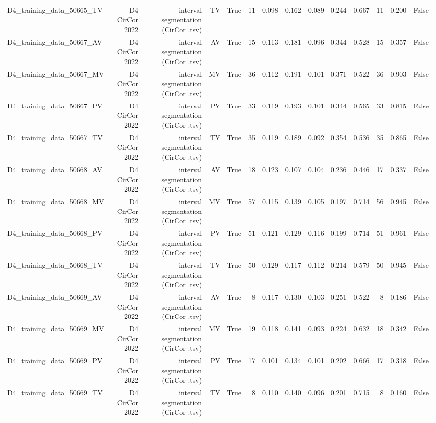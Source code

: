 \begin{table}[htbp]
\begin{tabular}{lrrrrrrrrrrrrr}
    D4\_training\_data\_50665\_TV & D4 CirCor 2022 & interval segmentation (CirCor .tsv) & TV & True & 11 & 0.098 & 0.162 & 0.089 & 0.244 & 0.667 & 11 & 0.200 & False \\
    D4\_training\_data\_50667\_AV & D4 CirCor 2022 & interval segmentation (CirCor .tsv) & AV & True & 15 & 0.113 & 0.181 & 0.096 & 0.344 & 0.528 & 15 & 0.357 & False \\
    D4\_training\_data\_50667\_MV & D4 CirCor 2022 & interval segmentation (CirCor .tsv) & MV & True & 36 & 0.112 & 0.191 & 0.101 & 0.371 & 0.522 & 36 & 0.903 & False \\
    D4\_training\_data\_50667\_PV & D4 CirCor 2022 & interval segmentation (CirCor .tsv) & PV & True & 33 & 0.119 & 0.193 & 0.101 & 0.344 & 0.565 & 33 & 0.815 & False \\
    D4\_training\_data\_50667\_TV & D4 CirCor 2022 & interval segmentation (CirCor .tsv) & TV & True & 35 & 0.119 & 0.189 & 0.092 & 0.354 & 0.536 & 35 & 0.865 & False \\
    D4\_training\_data\_50668\_AV & D4 CirCor 2022 & interval segmentation (CirCor .tsv) & AV & True & 18 & 0.123 & 0.107 & 0.104 & 0.236 & 0.446 & 17 & 0.337 & False \\
    D4\_training\_data\_50668\_MV & D4 CirCor 2022 & interval segmentation (CirCor .tsv) & MV & True & 57 & 0.115 & 0.139 & 0.105 & 0.197 & 0.714 & 56 & 0.945 & False \\
    D4\_training\_data\_50668\_PV & D4 CirCor 2022 & interval segmentation (CirCor .tsv) & PV & True & 51 & 0.121 & 0.129 & 0.116 & 0.199 & 0.714 & 51 & 0.961 & False \\
    D4\_training\_data\_50668\_TV & D4 CirCor 2022 & interval segmentation (CirCor .tsv) & TV & True & 50 & 0.129 & 0.117 & 0.112 & 0.214 & 0.579 & 50 & 0.945 & False \\
    D4\_training\_data\_50669\_AV & D4 CirCor 2022 & interval segmentation (CirCor .tsv) & AV & True & 8 & 0.117 & 0.130 & 0.103 & 0.251 & 0.522 & 8 & 0.186 & False \\
    D4\_training\_data\_50669\_MV & D4 CirCor 2022 & interval segmentation (CirCor .tsv) & MV & True & 19 & 0.118 & 0.141 & 0.093 & 0.224 & 0.632 & 18 & 0.342 & False \\
    D4\_training\_data\_50669\_PV & D4 CirCor 2022 & interval segmentation (CirCor .tsv) & PV & True & 17 & 0.101 & 0.134 & 0.101 & 0.202 & 0.666 & 17 & 0.318 & False \\
    D4\_training\_data\_50669\_TV & D4 CirCor 2022 & interval segmentation (CirCor .tsv) & TV & True & 8 & 0.110 & 0.140 & 0.096 & 0.201 & 0.715 & 8 & 0.160 & False \\

\end{tabular}
\end{table}
